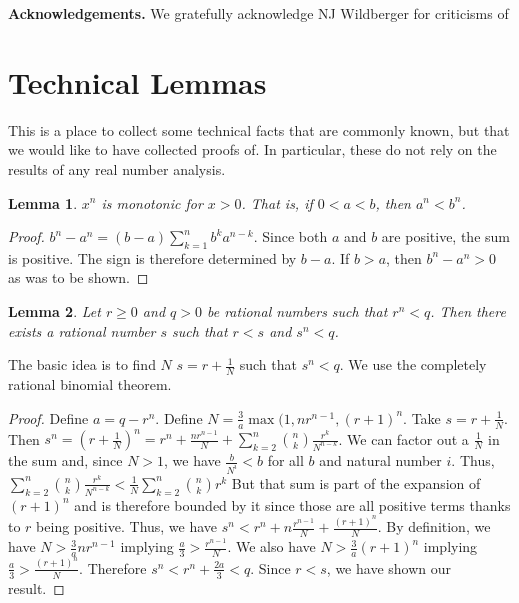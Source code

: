 \documentclass[12pt]{article}
\newtheorem{lemma}{Lemma}
\theoremstyle{remark}
\begin{document}
\bigskip

\noindent \textbf{Acknowledgements. } We gratefully acknowledge NJ Wildberger for criticisms of 

\appendix

\section{Technical Lemmas}

This is a place to collect some technical facts that are commonly known, but that we would like to have collected proofs of. In particular, these do not rely on the results of any real number analysis. 

\begin{lemma}
$x^n$ is monotonic for $x>0$. That is, if $0 < a < b$, then $a^n<b^n$.
\end{lemma}

\begin{proof}
$b^n-a^n= (b-a)\sum_{k=1}^n b^k a^{n-k}$. Since both $a$ and $b$ are positive, the sum is positive. The sign is therefore determined by $b-a$. If $b>a$, then $b^n-a^n > 0$ as was to be shown. 
\end{proof}

\begin{lemma}
Let $r \geq 0 $ and $q > 0$ be rational numbers such that $r^n < q$. Then there exists a rational number $s$ such that $r < s$ and $s^n < q$.
\end{lemma}

The basic idea is to find $N$ $s = r + \tfrac{1}{N}$ such that $s^n < q$. We use the completely rational binomial theorem.  

\begin{proof}
Define $a = q - r^n$. Define $N = \tfrac{3}{a} \max(1,n r^{n-1}, (r+1)^n$.  Take $s = r + \tfrac{1}{N}$. Then $s^n = (r+ \tfrac{1}{N})^n = r^n + \tfrac{n r^{n-1}}{N} + \sum_{k=2}^{n} \binom{n}{k} \tfrac{r^k}{N^{n-k}}$. We can factor out a $\tfrac{1}{N}$ in the sum and, since $N > 1$, we have $\tfrac{b}{N^i} < b$ for all $b$ and natural number $i$. Thus, $\sum_{k=2}^{n} \binom{n}{k} \tfrac{r^k}{N^{n-k}} < \tfrac{1}{N} \sum_{k=2}^{n} \binom{n}{k} r^k$  But that sum is part of the expansion of $(r+1)^n$ and is therefore bounded by it since those are all positive terms thanks to $r$ being positive. Thus, we have $s^n < r^n + n \tfrac{r^{n-1}}{N} + \tfrac{ (r+1)^n }{N}$.  By definition, we have $N > \tfrac{3}{a} n r^{n-1}$ implying $\tfrac{a}{3} > \tfrac{ r^{n-1}}{N}$. We also have $N > \tfrac{3}{a} (r+1)^n$ implying $\tfrac{a}{3} > \tfrac{(r+1)^n}{N}$. Therefore $s^n < r^n + \tfrac{2 a}{3} < q$. Since $r<s$, we have shown our result. 
\end{proof}
\end{document}
